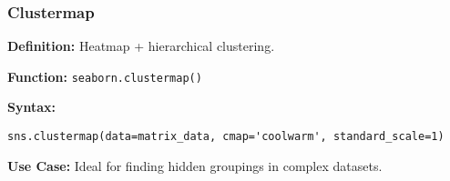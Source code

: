 \subsubsection{Clustermap}
\textbf{Definition:} Heatmap + hierarchical clustering.

\textbf{Function:} \texttt{seaborn.clustermap()}

\textbf{Syntax:}
\begin{verbatim}
sns.clustermap(data=matrix_data, cmap='coolwarm', standard_scale=1)
\end{verbatim}

\textbf{Use Case:} Ideal for finding hidden groupings in complex datasets.

